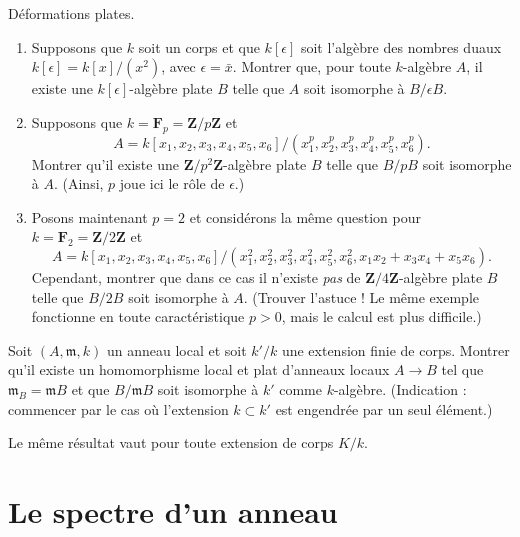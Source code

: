 \begin{exercise}
\label{exercise-flat-deformations}
Déformations plates.
\begin{enumerate}
\item Supposons que $k$ soit un corps et que $k[\epsilon]$ soit l'algèbre des
nombres duaux $k[\epsilon] = k[x]/(x^2)$, avec $\epsilon = \bar x$. Montrer que, pour
toute $k$-algèbre $A$, il existe une $k[\epsilon]$-algèbre plate $B$ telle que
$A$ soit isomorphe à $B/\epsilon B$.
\item Supposons que $k = {\mathbf F}_p = {\mathbf Z}/p{\mathbf Z}$ et
$$
A = k[x_1, x_2, x_3, x_4, x_5, x_6]/
(x_1^p, x_2^p, x_3^p, x_4^p, x_5^p, x_6^p).
$$
Montrer qu'il existe une ${\mathbf Z}/p^2{\mathbf Z}$-algèbre plate $B$ telle
que $B/pB$ soit isomorphe à $A$. (Ainsi, $p$ joue ici le rôle de $\epsilon$.)
\item Posons maintenant $p = 2$ et considérons la même question pour
$k = {\mathbf F}_2 = {\mathbf Z}/2{\mathbf Z}$ et
$$
A = k[x_1, x_2, x_3, x_4, x_5, x_6]/
(x_1^2, x_2^2, x_3^2, x_4^2, x_5^2, x_6^2, x_1x_2 + x_3x_4 + x_5x_6).
$$
Cependant, montrer que dans ce cas il n'existe {\it pas} de
${\mathbf Z}/4{\mathbf Z}$-algèbre plate $B$ telle que $B/2B$ soit isomorphe à
$A$. (Trouver l'astuce ! Le même exemple fonctionne en toute caractéristique
$p > 0$, mais le calcul est plus difficile.)
\end{enumerate}
\end{exercise}

\begin{exercise}
\label{exercise-flat-given-residue-field-extension}
Soit $(A, {\mathfrak m}, k)$ un anneau local et soit $k'/k$
une extension finie de corps. Montrer qu'il existe un homomorphisme local et plat
d'anneaux locaux $A \to B$ tel que ${\mathfrak m}_B = {\mathfrak m} B$ et que
$B/{\mathfrak m} B$ soit
isomorphe à $k'$ comme $k$-algèbre. (Indication : commencer par le cas où
l'extension $k \subset k'$ est engendrée par un seul élément.)
\end{exercise}

\begin{remark}
\label{remark-flat-given-residue-field-extension-general}
Le même résultat vaut pour toute extension de corps $K/k$.
\end{remark}









\section{Le spectre d'un anneau}
\label{section-spectrum-ring}

